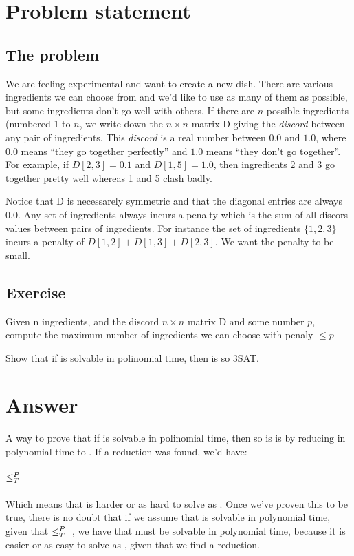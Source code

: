 \section*{Problem statement}
\subsection*{The \exc{} problem}
We are feeling experimental and want to create a new dish. There are various ingredients we can choose from and we'd like to use as many of them as possible, but some ingredients don't go well with others. If there are $n$ possible ingredients (numbered 1 to $n$, we write down the $n\times n$ matrix D giving the \textit{discord} between any pair of ingredients. This \textit{discord} is a real number between $0.0$ and $1.0$, where $0.0$ means ``they go together perfectly'' and $1.0$ means ``they don't go together''. For example, if $D[2,3] = 0.1$ and $D[1,5] = 1.0$, then ingredients 2 and 3 go together pretty well whereas 1  and 5 clash badly.

Notice that D is necessarely symmetric and that the diagonal entries are always $0.0$. Any set of ingredients always incurs a penalty which is the sum of all discors values between pairs of ingredients. For instance the set of ingredients $\{1,2,3\}$ incurs a penalty of $D[1,2] + D[1,3] + D[2,3]$. We want the penalty to be small.

\subsection*{Exercise}
Given n ingredients, and the discord $n \times n$ matrix D and some number $p$, compute the maximum number of ingredients we can choose with penaly $\leq p$

Show that if \exc{} is solvable in polinomial time, then is so 3SAT.

\section*{Answer}
A way to prove that if \exc{} is solvable in polinomial time, then so is \tsat{} is by reducing in polynomial time \tsat{} to \exc{}. If a reduction was found, we'd have:
\\ \\
\tsat{} $\leq_T^P{}$ \exc{}
\\ \\
Which means that \exc{} is harder or as hard to solve as \tsat{}. Once we've proven this to be true, there is no doubt that if we assume that \exc{} is solvable in polynomial time, given that \tsat{} $\leq_T^P{}$ \exc{}, we have that \tsat{} must be solvable in polynomial time, because it is easier or as easy to solve as \exc{}, given that we find a reduction.

